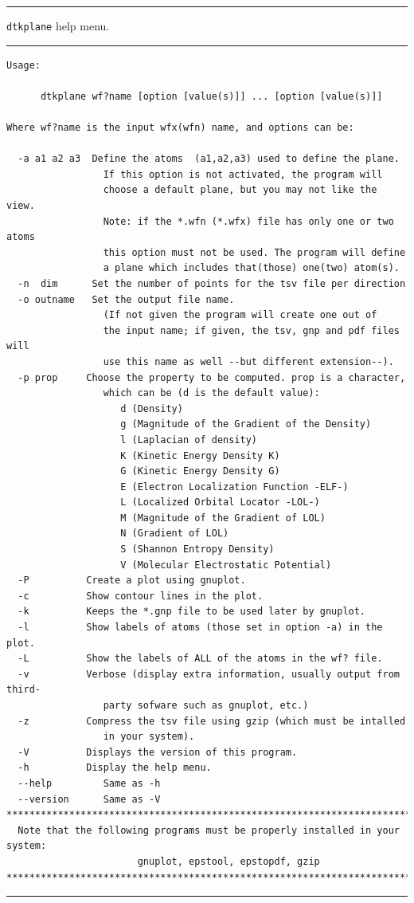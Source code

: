 \rule{\textwidth}{1pt}
{\center\texttt{dtkplane} help menu.\\}
\rule{\textwidth}{1pt}
\begin{footnotesize}
\begin{verbatim}
Usage:

      dtkplane wf?name [option [value(s)]] ... [option [value(s)]]

Where wf?name is the input wfx(wfn) name, and options can be:

  -a a1 a2 a3  Define the atoms  (a1,a2,a3) used to define the plane.
                 If this option is not activated, the program will 
                 choose a default plane, but you may not like the view.
                 Note: if the *.wfn (*.wfx) file has only one or two atoms
                 this option must not be used. The program will define
                 a plane which includes that(those) one(two) atom(s).
  -n  dim      Set the number of points for the tsv file per direction
  -o outname   Set the output file name.
                 (If not given the program will create one out of
                 the input name; if given, the tsv, gnp and pdf files will
                 use this name as well --but different extension--).
  -p prop     Choose the property to be computed. prop is a character,
                 which can be (d is the default value): 
                    d (Density)
                    g (Magnitude of the Gradient of the Density)
                    l (Laplacian of density)
                    K (Kinetic Energy Density K)
                    G (Kinetic Energy Density G)
                    E (Electron Localization Function -ELF-)
                    L (Localized Orbital Locator -LOL-)
                    M (Magnitude of the Gradient of LOL)
                    N (Gradient of LOL)
                    S (Shannon Entropy Density)
                    V (Molecular Electrostatic Potential)
  -P          Create a plot using gnuplot.
  -c          Show contour lines in the plot.
  -k          Keeps the *.gnp file to be used later by gnuplot.
  -l          Show labels of atoms (those set in option -a) in the plot.
  -L          Show the labels of ALL of the atoms in the wf? file.
  -v          Verbose (display extra information, usually output from third-
                 party sofware such as gnuplot, etc.)
  -z          Compress the tsv file using gzip (which must be intalled
                 in your system).
  -V          Displays the version of this program.
  -h          Display the help menu.
  --help         Same as -h
  --version      Same as -V
********************************************************************************
  Note that the following programs must be properly installed in your system:
                       gnuplot, epstool, epstopdf, gzip
********************************************************************************
\end{verbatim}
\end{footnotesize}
\rule{\textwidth}{1pt}
